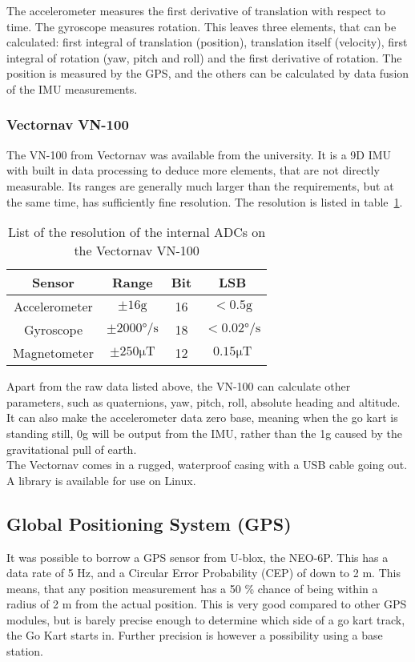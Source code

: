 The accelerometer measures the first derivative of translation with respect to time. 
The gyroscope measures rotation.
This leaves three elements, that can be calculated: first integral of translation (position), translation itself (velocity), first integral of rotation (yaw, pitch and roll) and the first derivative of rotation.
The position is measured by the GPS, and the others can be calculated by data fusion of the IMU measurements.\\

\subsubsection*{Vectornav VN-100}
The VN-100 from Vectornav was available from the university.
It is a 9D IMU with built in data processing to deduce more elements, that are not directly measurable.
Its ranges are generally much larger than the requirements, but at the same time, has sufficiently fine resolution.
The resolution is listed in table~\ref{tab:vectornav_measurement_resolution}.

\begin{table}
	\centering
	\begin{tabular}{ c | c c c}
		{\textbf{Sensor}} & {\textbf{Range}} & {\textbf{Bit}} & {\textbf{LSB}}\\
		\hline
		{Accelerometer}	& { $\pm 16 \mathrm{g}$}					& {16}	& {$< 0.5 \mathrm{g}$}\\
		{Gyroscope}		& { $\pm 2000\si{\degree \per \second}$ }	& {18}	& {$<0.02 \si{\degree \per \second}$}\\
		{Magnetometer}	& { $\pm 250 \si{\micro \tesla}$}			& {12}	& {$0.15 \si{\micro \tesla}$}
	\end{tabular}
	\caption{List of the resolution of the internal ADCs on the Vectornav VN-100}
	\label{tab:vectornav_measurement_resolution}
\end{table}

Apart from the raw data listed above, the VN-100 can calculate other parameters, such as quaternions, yaw, pitch, roll, absolute heading and altitude.
It can also make the accelerometer data zero base, meaning when the go kart is standing still, 0g will be output from the IMU, rather than the 1g caused by the gravitational pull of earth. \\

The Vectornav comes in a rugged, waterproof casing with a USB cable going out.
A library is available for use on Linux.

\subsection{Global Positioning System (GPS)}
It was possible to borrow a GPS sensor from U-blox, the NEO-6P.
This has a data rate of 5 Hz, and a Circular Error Probability (CEP) of down to 2 m.
This means, that any position measurement has a 50 \% chance of being within a radius of 2 m from the actual position. 
This is very good compared to other GPS modules, but is barely precise enough to determine which side of a go kart track, the Go Kart starts in. 
Further precision is however a possibility using a base station.\\

